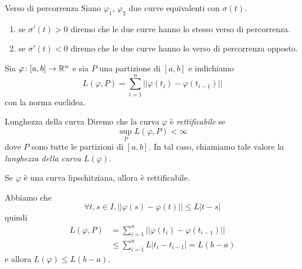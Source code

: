 \documentclass[a4paper]{article}
\begin{document}
\begin{radioactive}
\begin{snippetdefinition}{Verso di percorrenza}
    Siano \(\varphi_1\), \(\varphi_2\) due curve equivalenti con \(\sigma(t)\).
    \begin{enumerate}
        \item se \(\sigma'(t) > 0\) diremo che le due curve hanno lo stesso verso di percorrenza.
        \item se \(\sigma'(t) < 0\) diremo che le due curve hanno lo verso di percorrenza opposto.
    \end{enumerate}
\end{snippetdefinition}
\end{radioactive}

Sia \(\varphi \colon [a,b] \to \mathbb{R}^n\) e sia \(P\) una partizione di \([a,b]\)
e indichiamo
\[
    L(\varphi, P) = \sum_{i=1}^n ||\varphi(t_i) - \varphi(t_{i-1})||
\]
con la norma euclidea.

\begin{radioactive}
\begin{snippetdefinition}{Lunghezza della curva}
    Diremo che la curva \(\varphi\) è \emph{rettificabile} se
    \[
        \sup_P L(\varphi, P) < \infty
    \]
    dove \(P\) sono tutte le partizioni di \([a,b]\). In tal caso, chiamiamo tale valore
    la \emph{lunghezza della curva} \(L(\varphi)\).
\end{snippetdefinition}
\end{radioactive}

\begin{radioactive}
\begin{snippetproposition}{}
    Se \(\varphi\) è una curva lipschitziana, allora è rettificabile.
\end{snippetproposition}
\end{radioactive}

\begin{radioactive}
\begin{snippetproof}{}
    Abbiamo che
    \[
        \forall t,s \in I, ||\varphi(s)-\varphi(t)|| \leq L|t-s|
    \]
    quindi
    \begin{align*}
        L(\varphi, P) &= \sum_{i=1}^n ||\varphi(t_i) - \varphi(t_{i-1})|| \\
        &\leq \sum_{i=1}^n L|t_i-t_{i-1}| = L(b-a)
    \end{align*}
    e allora \(L(\varphi) \leq L(b-a)\).
\end{snippetproof}
\end{radioactive}
\end{document}
